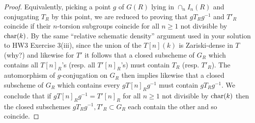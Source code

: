 \documentclass[10pt]{article}
\renewcommand{\(}{\left(}
\renewcommand{\)}{\right)}
\numberwithin{thm}{subsection}
\begin{document}
\begin{proof}
Equivalently, picking a point $g$ of $G(R)$ lying in $\cap_n I_n(R)$
and conjugating $T_R$ by this point, we are reduced to proving that
$gT_R g^{-1}$ and $T'_R$ coincide if their $n$-torsion subgroups coincide
for all $n \ge 1$ not divisible by ${\rm{char}}(k)$.   By the same ``relative schematic density'' 
argument used
in your solution to HW3 Exercise 3(iii), since the union of the $T[n](k)$ is Zariski-dense in
$T$ (why?) and likewise for $T'$ it follows that a closed subscheme of $G_R$ which contains
all $T[n]_R$'s (resp. all $T'[n]_R$'s) must contain $T_R$ (resp. $T'_R$).  The automorphism
of $g$-conjugation on $G_R$ then implies likewise that a closed subscheme of
$G_R$ which contains every $gT[n]_R g^{-1}$ must contain $g T_R g^{-1}$.
We conclude that if $g T[n]_R g^{-1} = T'[n]_R$ for all $n \ge 1$ not divisible by
${\rm{char}}(k)$ then the closed subschemes $g T_R g^{-1}, T'_R \subset G_R$
each contain the other and so coincide.
\end{proof}
\end{document}
